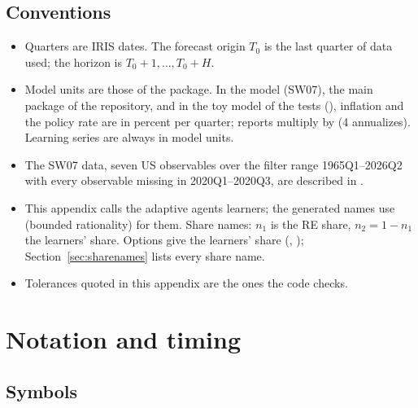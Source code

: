 \documentclass[11pt,a4paper]{article}
\begin{document}
\subsection{Conventions}

\begin{itemize}[nosep]
  \item Quarters are IRIS dates. The forecast origin $T_0$ is the last quarter of data used;
        the horizon is $T_0+1,\dots,T_0+H$.
  \item Model units are those of the package. In the \citet{smets2007} model (SW07), the main
        package of the repository, and in the toy model of the tests (),
        inflation and the policy rate are in percent per quarter; reports multiply by
         (4 annualizes). Learning series are always in model units.
  \item The SW07 data, seven US observables over the filter range 1965Q1--2026Q2 with every
        observable missing in 2020Q1--2020Q3, are described in .
  \item This appendix calls the adaptive agents learners; the generated names use 
        (bounded rationality) for them. Share names: $n_1$ is the RE share, $n_2 = 1-n_1$ the
        learners' share. Options give the learners' share (,
        ); Section~\ref{sec:sharenames} lists every share name.
  \item Tolerances quoted in this appendix are the ones the code checks.
\end{itemize}

\section{Notation and timing}\label{sec:notation}

\subsection{Symbols}
\end{document}
